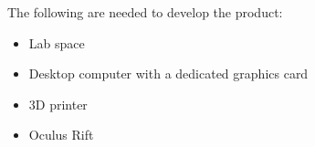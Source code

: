 The following are needed to develop the product:

\begin{itemize}
	\item Lab space
	\item Desktop computer with a dedicated graphics card
	\item 3D printer
	\item Oculus Rift
\end{itemize}